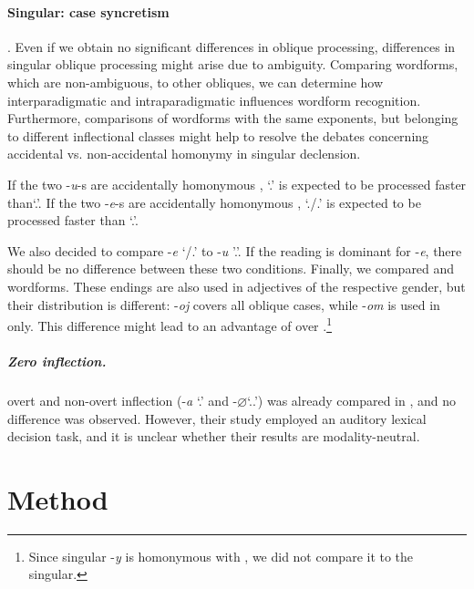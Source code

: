 \documentclass[output=paper, modfonts,newtxmath,hidelinks]{langscibook}
\begin{document}
\paragraph*{Singular: case syncretism}. Even if we obtain no significant differences in  oblique processing, differences in singular oblique processing might arise due to ambiguity. Comparing  wordforms, which are non-ambiguous, to other obliques, we can determine how interparadigmatic and intraparadigmatic  influences wordform recognition. Furthermore, comparisons of wordforms with the same exponents, but belonging to different inflectional classes might help to  resolve the debates concerning accidental vs. non-accidental homo\-nymy in  singular declension.

If the two -\textit{u}-s are accidentally homonymous  \citep{wiese2004categories}, `\accc.\fem' is expected to be processed faster than`\datt.\masc'. If the two -\textit{e}-s are accidentally homonymous \citep{muller2004decomposing}, `\datt./\locc.\fem' is expected to be processed faster than `\locc.\masc'.

We also decided to compare -\textit{e} `\datt/\locc.\fem' to -\textit{u} '\datt.\masc'. If the  reading is dominant for -\textit{e}, there should be no difference between these two conditions. Finally, we compared  and   wordforms. These endings are also used in adjectives of the respective gender, but their distribution is different:  -\textit{oj} covers all oblique cases, while  -\textit{om} is used in  only. This difference might lead to an advantage of   over  .\footnote{ Since   singular -\textit{y} is homonymous with  , we did not compare it to the   singular.}

\subparagraph*{{Zero  inflection.}}  overt and non-overt  inflection (-\textit{a} `\nomm.\fem' and -\textit{$\varnothing$}`\nomm.\accc.\masc') was already compared in \citet{gor2017processing}, and no difference was observed. However, their study employed an auditory lexical decision task, and it is unclear whether their results are modality-neutral.

\section{Method}
\end{document}

